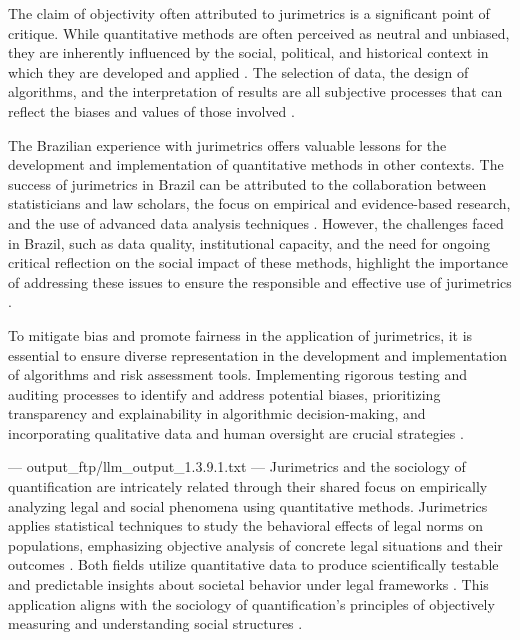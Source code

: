 The claim of objectivity often attributed to jurimetrics is a significant point of critique. While quantitative methods are often perceived as neutral and unbiased, they are inherently influenced by the social, political, and historical context in which they are developed and applied \cite{10.1057/s41599-020-00557-0}. The selection of data, the design of algorithms, and the interpretation of results are all subjective processes that can reflect the biases and values of those involved \cite{10.1057/s41599-020-00557-0}.

The Brazilian experience with jurimetrics offers valuable lessons for the development and implementation of quantitative methods in other contexts. The success of jurimetrics in Brazil can be attributed to the collaboration between statisticians and law scholars, the focus on empirical and evidence-based research, and the use of advanced data analysis techniques \cite{10.1007/s11186-021-09453-1,10.3390/fi9040068}. However, the challenges faced in Brazil, such as data quality, institutional capacity, and the need for ongoing critical reflection on the social impact of these methods, highlight the importance of addressing these issues to ensure the responsible and effective use of jurimetrics \cite{10.1007/s11186-021-09453-1,10.3390/fi9040068}.

To mitigate bias and promote fairness in the application of jurimetrics, it is essential to ensure diverse representation in the development and implementation of algorithms and risk assessment tools. Implementing rigorous testing and auditing processes to identify and address potential biases, prioritizing transparency and explainability in algorithmic decision-making, and incorporating qualitative data and human oversight are crucial strategies \cite{10.1057/s41599-020-00557-0,10.1590/15174522-105471}.


---
output_ftp/llm_output_1.3.9.1.txt
---
Jurimetrics and the sociology of quantification are intricately related through their shared focus on empirically analyzing legal and social phenomena using quantitative methods. Jurimetrics applies statistical techniques to study the behavioral effects of legal norms on populations, emphasizing objective analysis of concrete legal situations and their outcomes \cite{nunes2018}. Both fields utilize quantitative data to produce scientifically testable and predictable insights about societal behavior under legal frameworks \cite{nunes2018, colombo2017}. This application aligns with the sociology of quantification's principles of objectively measuring and understanding social structures \cite{nunes2018, calvo2024}.

